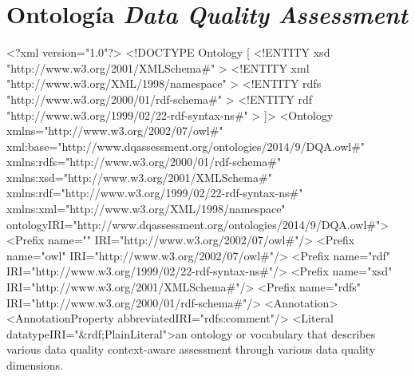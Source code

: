 \chapter{Ontología \textit{Data Quality Assessment}}
\label{chap:ontologia}

\begin{listing}[
  language = XML,
  numbers=left,
  numberstyle=\tiny,
  stepnumber=5,
  numbersep=5pt,
  frame=single,
  caption  = {Vocabulario utilizado para los resultados finales},
  label    = code:onto-vocabulary]
<?xml version="1.0"?>
<!DOCTYPE Ontology [
    <!ENTITY xsd "http://www.w3.org/2001/XMLSchema#" >
    <!ENTITY xml "http://www.w3.org/XML/1998/namespace" >
    <!ENTITY rdfs "http://www.w3.org/2000/01/rdf-schema#" >
    <!ENTITY rdf "http://www.w3.org/1999/02/22-rdf-syntax-ns#" >
]>
<Ontology xmlns="http://www.w3.org/2002/07/owl#"
     xml:base="http://www.dqassessment.org/ontologies/2014/9/DQA.owl#"
     xmlns:rdfs="http://www.w3.org/2000/01/rdf-schema#"
     xmlns:xsd="http://www.w3.org/2001/XMLSchema#"
     xmlns:rdf="http://www.w3.org/1999/02/22-rdf-syntax-ns#"
     xmlns:xml="http://www.w3.org/XML/1998/namespace"
     ontologyIRI="http://www.dqassessment.org/ontologies/2014/9/DQA.owl#">
    <Prefix name="" IRI="http://www.w3.org/2002/07/owl#"/>
    <Prefix name="owl" IRI="http://www.w3.org/2002/07/owl#"/>
    <Prefix name="rdf" IRI="http://www.w3.org/1999/02/22-rdf-syntax-ns#"/>
    <Prefix name="xsd" IRI="http://www.w3.org/2001/XMLSchema#"/>
    <Prefix name="rdfs" IRI="http://www.w3.org/2000/01/rdf-schema#"/>
    <Annotation>
        <AnnotationProperty abbreviatedIRI="rdfs:comment"/>
        <Literal datatypeIRI="&rdf;PlainLiteral">an ontology or vocabulary that describes various data quality context-aware assessment through various data quality dimensions. 


\end{listing}
